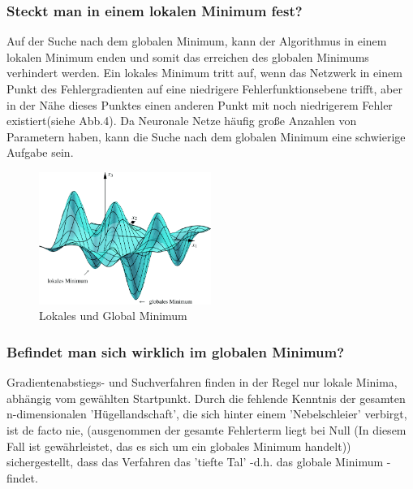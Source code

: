 \subsubsection{Steckt man in einem lokalen Minimum fest?}\label{subsec:gradientenverfahren:fehlerquellen_lokalen_minimum}
  Auf der Suche nach dem globalen Minimum, kann der Algorithmus in einem lokalen Minimum enden und somit das erreichen des globalen Minimums verhindert werden.
  Ein lokales Minimum tritt auf, wenn das Netzwerk in einem Punkt des Fehlergradienten auf eine niedrigere Fehlerfunktionsebene trifft, aber in der Nähe dieses Punktes einen anderen Punkt mit noch niedrigerem Fehler existiert(siehe Abb.4).
  Da Neuronale Netze häufig große Anzahlen von Parametern haben, kann die Suche nach dem globalen Minimum eine schwierige Aufgabe sein\cite{HS97}.
  \\
  \begin{figure}[ht]
    \centering
    \includegraphics[width=0.5\textwidth]{Sources/03-3.3.2_3-dimensionaler_abstieg.png}
    \caption{Lokales und Global Minimum}
    \label{subsec:lokale-globale-minima}
\end{figure}

\subsubsection{Befindet man sich wirklich im globalen Minimum?}\label{subsec:gradientenverfahren:fehlerquellen_globalen_minimum}
  Gradientenabstiegs- und Suchverfahren finden in der Regel nur lokale Minima, abhängig vom gewählten Startpunkt. Durch die fehlende Kenntnis der gesamten n-dimensionalen 'Hügellandschaft', die sich hinter 
  einem 'Nebelschleier' verbirgt, ist de facto nie, (ausgenommen der gesamte Fehlerterm liegt bei Null (In diesem Fall ist gewährleistet, das es sich um ein globales Minimum handelt))
  sichergestellt, dass das Verfahren das 'tiefte Tal' -d.h. das globale Minimum - findet.

